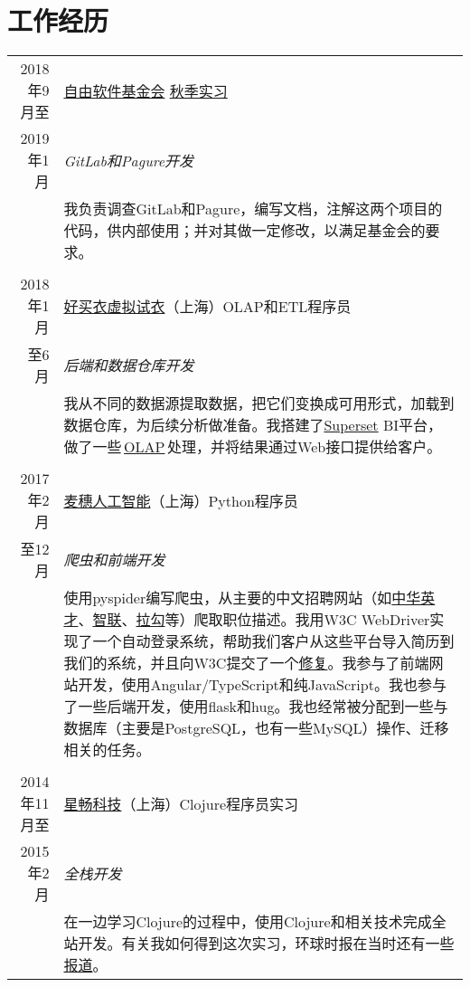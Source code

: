\documentclass[a4paper,11pt]{article}
\begin{document}
\section{工作经历}
\begin{tabularx}{\textwidth}{r|X}
  2018年9月至  & \href{https://www.fsf.org/}{自由软件基金会} \hfill \href{https://www.fsf.org/blogs/sysadmin/introducing-lei-zhao-intern-with-the-fsf-tech-team}{秋季实习} \\
  2019年1月    & \emph{GitLab和Pagure开发} \\
               & \footnotesize 我负责调查GitLab和Pagure，编写文档，注解这两个项目的代码，供内部使用；并对其做一定修改，以满足基金会的要求。\\
  \multicolumn{2}{c}{} \\
  2018年1月    & \href{https://www.haomaiyi.com/}{好买衣虚拟试衣}（上海）\hfill OLAP和ETL程序员 \\
  至6月        & \emph{后端和数据仓库开发}\\
               & \footnotesize 我从不同的数据源提取数据，把它们变换成可用形式，加载到数据仓库，为后续分析做准备。我搭建了\href{https://superset.incubator.apache.org/}{Superset} BI平台，做了一些\,\href{https://wiki.mbalib.com/wiki/\%E8\%81\%94\%E6\%9C\%BA\%E5\%88\%86\%E6\%9E\%90\%E5\%A4\%84\%E7\%90\%86}{OLAP}\,处理，并将结果通过Web接口提供给客户。\\
  \multicolumn{2}{c}{} \\
  2017年2月    & \href{https://www.mesoor.com/}{麦穗人工智能}（上海）\hfill Python程序员 \\
  至12月       & \emph{爬虫和前端开发}\\
               & \footnotesize 使用pyspider编写爬虫，从主要的中文招聘网站（如\href{http://www.chinahr.com/}{中华英才}、\href{https://www.zhaopin.com/}{智联}、\href{https://www.lagou.com/}{拉勾}等）爬取职位描述。我用W3C WebDriver实现了一个自动登录系统，帮助我们客户从这些平台导入简历到我们的系统，并且向W3C提交了一个\href{https://github.com/w3c/web-platform-tests/pull/6743}{修复}。我参与了前端网站开发，使用Angular/TypeScript和纯JavaScript。我也参与了一些后端开发，使用flask和hug。我也经常被分配到一些与数据库（主要是PostgreSQL，也有一些MySQL）操作、迁移相关的任务。\\
  \multicolumn{2}{c}{} \\
  2014年11月至 & \href{http://www.starworking.com/}{星畅科技}（上海）\hfill Clojure程序员实习 \\
  2015年2月    & \emph{全栈开发}\\
               & \footnotesize 在一边学习Clojure的过程中，使用Clojure和相关技术完成全站开发。有关我如何得到这次实习，环球时报在当时还有一些\href{http://www.globaltimes.cn/content/871111.shtml}{报道}。
\end{tabularx}
\end{document}
